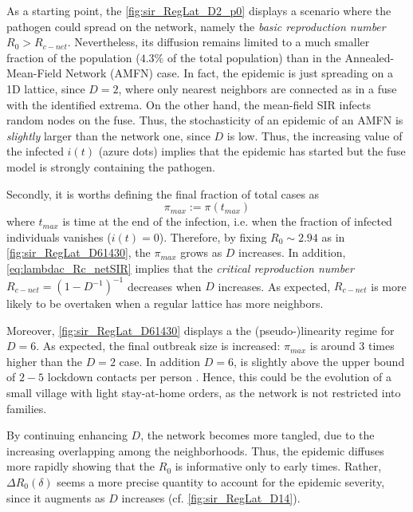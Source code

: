 \documentclass[a4paper,10pt]{book} %
\theoremstyle{definition}
\begin{document}
As a starting point, the \autoref{fig:sir_RegLat_D2_p0} displays a scenario where the pathogen could spread on the network, namely the \textit{basic reproduction number} $R_0 > R_{c-net}$. Nevertheless, its diffusion remains limited to a much smaller fraction of the population ($4.3 \%$ of the total population) than in the Annealed-Mean-Field Network (AMFN) case. In fact, the epidemic is just spreading on a 1D lattice, since $ D = 2$, where only nearest neighbors are connected as in a fuse with the identified extrema. On the other hand, the mean-field SIR infects random nodes on the fuse. Thus, the stochasticity of an epidemic of an AMFN is \textit{slightly}  larger than the network one, since $ D$ is low. Thus, the increasing value of the infected $i(t)$ (azure dots) implies that the epidemic has started but the fuse model is strongly containing the pathogen. 

Secondly, it is worths defining the final fraction of total cases as
\begin{equation}
	\pi_{max} := \pi(t_{max})
	\label{eq:def_pmax}
\end{equation}
where $ t_{max}$ is time at the end of the infection, i.e. when the fraction of infected individuals vanishes ($i(t) = 0$).
Therefore, by fixing $R_0 \sim 2.94$ as in \autoref{fig:sir_RegLat_D61430}, the $ \pi_{max}$ grows as $D$ increases. In addition, \autoref{eq:lambdac_Rc_netSIR} implies that the
\textit{critical reproduction number} $R_{c-net} = (1-D^{-1})^{-1}$ decreases when $D$ increases. As expected, $R_{c-net}$ is more likely to be overtaken when a regular lattice has more neighbors.

Moreover, \autoref{fig:sir_RegLat_D61430} displays a the (pseudo-)linearity regime for $ D = 6$. As expected, the final outbreak size is increased: $ \pi_{max}$ is around $ 3$ times higher than the $ D=2$ case. In addition $D = 6$, is slightly above the upper bound of $2-5$ lockdown contacts per person \cite{Liu::2021_Review_SContactPattern}. Hence, this could be the evolution of a small village with light stay-at-home orders, as the network is not restricted into families.


By continuing enhancing $ D$, the network becomes more tangled, due to the increasing overlapping among  the neighborhoods. Thus, the epidemic diffuses more rapidly showing that the $ R_0$ is informative only to early times. Rather, $\Delta R_0(\delta)$ seems a more precise quantity to account for the epidemic severity, since it augments as $D$ increases (cf. \autoref{fig:sir_RegLat_D14}).
\end{document}
